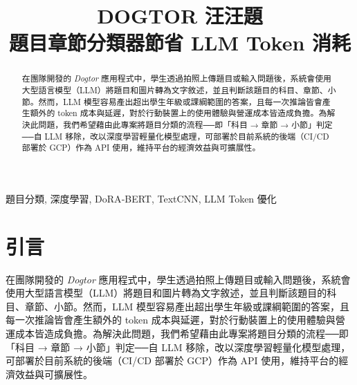 \documentclass[10pt,conference]{IEEEtran}
\begin{document}
\begin{CJK}{UTF8}{bsmi}

\title{DOGTOR 汪汪題 \\ 題目章節分類器節省 LLM Token 消耗}

\author{
}


\maketitle

\begin{abstract}
在團隊開發的 \textit{Dogtor} 應用程式中，學生透過拍照上傳題目或輸入問題後，系統會使用大型語言模型（LLM）將題目和圖片轉為文字敘述，並且判斷該題目的科目、章節、小節。然而，LLM 模型容易產出超出學生年級或課綱範圍的答案，且每一次推論皆會產生額外的 token 成本與延遲，對於行動裝置上的使用體驗與營運成本皆造成負擔。為解決此問題，我們希望藉由此專案將題目分類的流程──即「科目 → 章節 → 小節」判定──自 LLM 移除，改以深度學習輕量化模型處理，可部署於目前系統的後端（CI/CD 部署於 GCP）作為 API 使用，維持平台的經濟效益與可擴展性。
\end{abstract}

\begin{IEEEkeywords}
題目分類, 深度學習, DoRA‐BERT, TextCNN, LLM Token 優化
\end{IEEEkeywords}

\section{引言}
在團隊開發的 \textit{Dogtor} 應用程式中，學生透過拍照上傳題目或輸入問題後，系統會使用大型語言模型（LLM）將題目和圖片轉為文字敘述，並且判斷該題目的科目、章節、小節。然而，LLM 模型容易產出超出學生年級或課綱範圍的答案，且每一次推論皆會產生額外的 token 成本與延遲，對於行動裝置上的使用體驗與營運成本皆造成負擔。為解決此問題，我們希望藉由此專案將題目分類的流程──即「科目 → 章節 → 小節」判定──自 LLM 移除，改以深度學習輕量化模型處理，可部署於目前系統的後端（CI/CD 部署於 GCP）作為 API 使用，維持平台的經濟效益與可擴展性。


\end{CJK}
\end{document}
